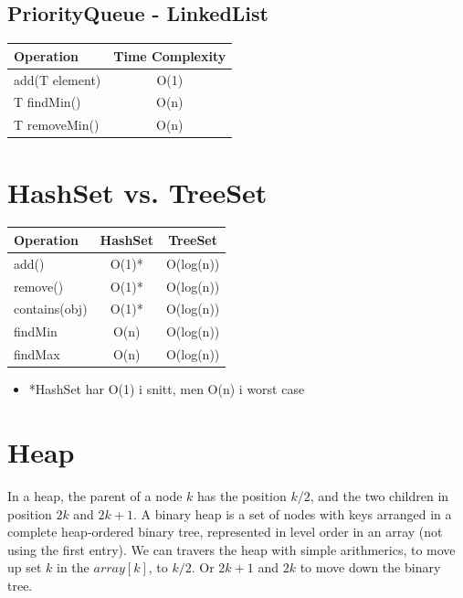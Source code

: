 \documentclass{article}
\begin{document}
\subsection{PriorityQueue - LinkedList}
\begin{table}[!ht]
\centering
\begin{tabular}{|l|c|}
\hline
\textbf{Operation} & \textbf{Time Complexity} \\
\hline
add(T element) & O(1) \\
\hline
T findMin() & O(n) \\
\hline
T removeMin() & O(n) \\
\hline
\end{tabular}
\end{table}

\newpage


\section{HashSet vs. TreeSet}
\begin{table}[!ht]
\centering
\begin{tabular}{|l|c|c|}
\hline
\textbf{Operation} & \textbf{HashSet} & \textbf{TreeSet} \\
\hline
add() & O(1)* & O(log(n)) \\
\hline
remove() & O(1)* & O(log(n)) \\
\hline
contains(obj) & O(1)* & O(log(n)) \\
\hline
findMin & O(n) & O(log(n))\\
\hline
findMax & O(n) & O(log(n))\\
\hline
\end{tabular}
\end{table}
\begin{itemize}
  \item *HashSet har O(1) i snitt, men O(n) i worst case
\end{itemize}



\section{Heap}
In a heap, the parent of a node $k$ has the position $k/2$, and the two children in position $2k$ and $2k+1$.
A binary heap is a set of nodes with keys arranged in a complete heap-ordered binary tree, represented in level order in an array (not using the first entry).
We can travers the heap with simple arithmerics, to move up set $k$ in the $array[k]$, to $k/2$. Or $2k+1$ and $2k$ to move down the binary tree. 
\end{document}
